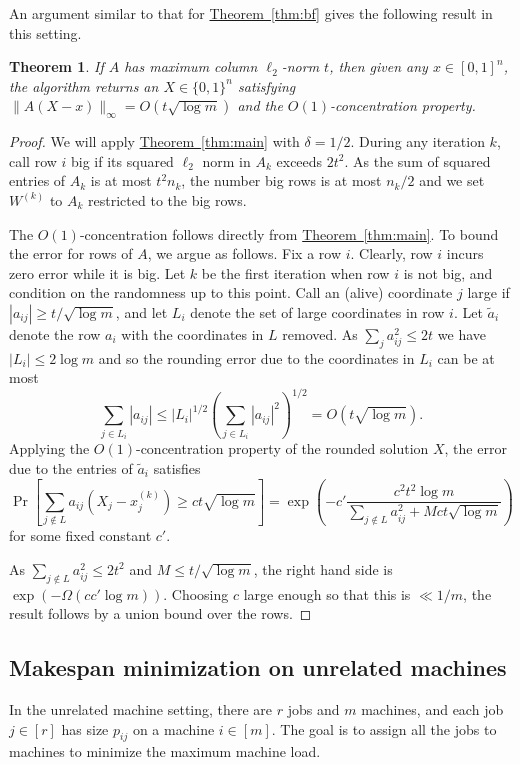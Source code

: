 \documentclass[11pt]{article}
\newtheorem{theorem}{Theorem}[section]
\theoremstyle{definition}
\newcommand{\expref}[2]{\texorpdfstring{\hyperref[#2]{#1~\ref{#2}}}{#1~\ref{#2}}}
\begin{document}
An argument similar to that for \expref{Theorem}{thm:bf} gives the following result in this setting.
\begin{theorem} If $A$ has maximum column $\ell_2$-norm  $t$, then given any $x\in [0,1]^n$, the algorithm returns an $X\in \{0,1\}^n$ satisfying $\|A(X-x)\|_\infty =O(t \sqrt{\log m})$ and the $O(1)$-concentration property.
\end{theorem}
\begin{proof} We will apply \expref{Theorem}{thm:main} with $\delta=1/2$.
During any iteration $k$, call
row $i$ big if its squared $\ell_2$ norm in $A_k$ exceeds $2t^2$. As the sum of squared entries of $A_k$ is at most $t^2 n_k$, the number big rows is at most $n_k/2$ and we set $W^{(k)}$ to $A_k$ restricted to the big rows.

The $O(1)$-concentration follows directly from \expref{Theorem}{thm:main}. To bound the error for rows of $A$, we argue as follows. Fix a row $i$. Clearly, row $i$ incurs zero error while it is big. Let $k$ be the first iteration when row $i$ is not big, and condition on the randomness up to this point.
Call an (alive) coordinate $j$ large if $|a_{ij}| \geq t/\sqrt{\log m}$, and let $L_i$ denote the set of large coordinates in row $i$.
Let $\tilde{a}_i$ denote the row $a_i$ with the coordinates in $L$ removed.
As $\sum_j a_{ij}^2 \leq 2t$ we have $|L_i| \leq 2\log m$ and so
the rounding error due to the coordinates in $L_i$ can be at most
\[ \sum_{j \in L_i} |a_{ij}| \leq |L_i|^{1/2} (  \sum_{j \in L_i} |a_{ij}|^2)^{1/2}  = O(t \sqrt{\log m}).\]
Applying the $O(1)$-concentration property of the rounded solution $X$, the error due to the entries of $\tilde{a}_i$ satisfies   
\[ \Pr\left[ \sum_{j \notin L}  a_{ij} (X_j-x^{(k)}_j)  \geq   c t \sqrt{ \log m} \right]
 =   \exp\left(-c'\frac{c^2t^2\log m}{\sum_{j \notin L} a_{ij}^2  + Mct \sqrt{\log m}  }\right) \]
 for some fixed constant $c'$. 
 
 As $\sum_{j \notin L} a_{ij}^2 \leq 2 t^2  $ and $M \leq t/ \sqrt{\log m}$, the right hand side is $\exp(-\Omega(cc'\log m))$. Choosing $c$ large enough so that this is $\ll 1/m$, the result follows by a union bound over the rows.
\end{proof}

%
%

\subsection{Makespan minimization on unrelated machines}
\label{s:makespan}
In the unrelated machine setting, there are $r$ jobs and $m$ machines, and each job $j \in [r]$ has size $p_{ij}$ on a machine $i \in [m]$.
The goal is to assign all the jobs to machines to minimize the maximum machine load.
\end{document}
